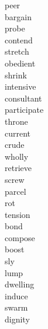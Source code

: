 \documentclass[b5paper, 11pt]{ctexart}
\begin{document}
\begin{multicols*}{3}
\begin{description}
\item[peer]

\item[bargain]

\item[probe]

\item[contend]

\item[stretch]

\item[obedient]

\item[shrink]

\item[intensive]

\item[consultant]

\item[participate]

\item[throne]

\item[current]

\item[crude]

\item[wholly]

\item[retrieve]

\item[screw]

\item[parcel]

\item[rot]

\item[tension]

\item[bond]

\item[compose]

\item[boost]

\item[sly]

\item[lump]

\item[dwelling]

\item[induce]

\item[swarm]

\item[dignity]


\end{description}
\end{multicols*}
\end{document}
